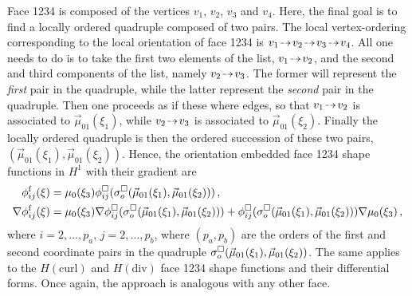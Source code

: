 Face 1234 is composed of the vertices $v_1$, $v_2$, $v_3$ and $v_4$.
Here, the final goal is to find a locally ordered quadruple composed of two pairs.
The local vertex-ordering corresponding to the local orientation of face 1234 is $v_1\tdashto v_2\tdashto v_3\tdashto v_4$.
All one needs to do is to take the first two elements of the list, $v_1\tdashto v_2$, and the second and third components of the list, namely $v_2\tdashto v_3$.
The former will represent the \textit{first} pair in the quadruple, while the latter represent the \textit{second} pair in the quadruple.
Then one proceeds as if these where edges, so that $v_1\tdashto v_2$ is associated to $\vec{\mu}_{01}(\xi_1)$, while $v_2\tdashto v_3$ is associated to $\vec{\mu}_{01}(\xi_2)$.
Finally the locally ordered quadruple is then the ordered succession of these two pairs, $(\vec{\mu}_{01}(\xi_1),\vec{\mu}_{01}(\xi_2))$.
Hence, the orientation embedded face 1234 shape functions in $H^1$ with their gradient are
\begin{equation*}
	\begin{aligned}
		\phi_{ij}^\mathrm{f}(\xi)&=\mu_0(\xi_3)\phi_{ij}^\square(\sigma_o^\square(\vec{\mu}_{01}(\xi_1),\vec{\mu}_{01}(\xi_2)))\,,\\
		\nabla\phi_{ij}^\mathrm{f}(\xi)&=\mu_0(\xi_3)\nabla\phi_{ij}^\square(\sigma_o^\square(\vec{\mu}_{01}(\xi_1),\vec{\mu}_{01}(\xi_2)))
			+\phi_{ij}^\square(\sigma_o^\square(\vec{\mu}_{01}(\xi_1),\vec{\mu}_{01}(\xi_2)))\nabla\mu_0(\xi_3)\,,
	\end{aligned}
\end{equation*}
where $i=2,\ldots,p_a$, $j=2,\ldots,p_b$, where $(p_a,p_b)$ are the orders of the first and second coordinate pairs in the quadruple $\sigma_o^\square(\vec{\mu}_{01}(\xi_1),\vec{\mu}_{01}(\xi_2))$.
The same applies to the $H(\mathrm{curl})$ and $H(\mathrm{div})$ face 1234 shape functions and their differential forms.
Once again, the approach is analogous with any other face.